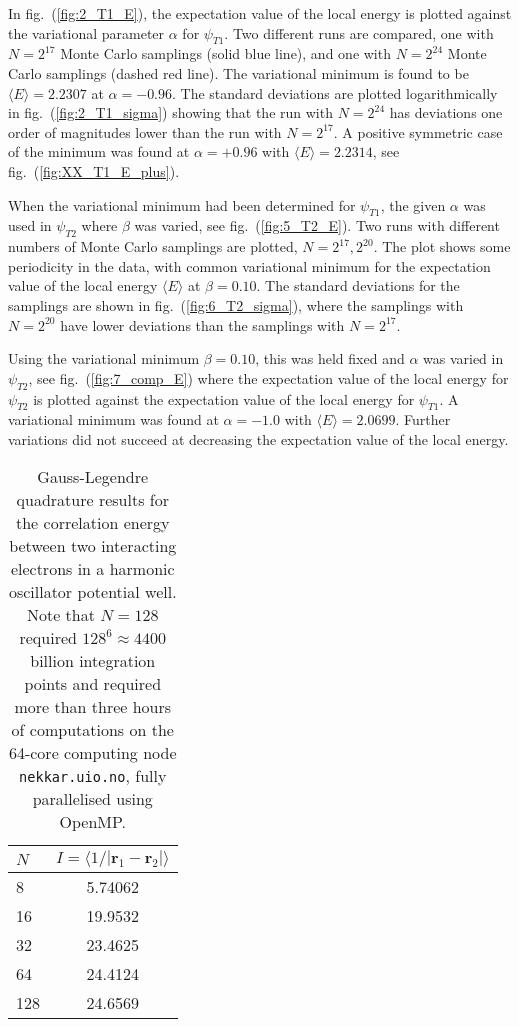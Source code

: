 \documentclass[a4paper,11pt]{article}
\begin{document}
In fig.~(\ref{fig:2_T1_E}), the expectation value of the local energy is plotted against the variational parameter $\alpha$ for $\psi_{T1}$. Two different runs are compared, one with $N=2^{17}$ Monte Carlo samplings (solid blue line), and one with $N=2^{24}$ Monte Carlo samplings (dashed red line). The variational minimum is found to be $\langle E \rangle = 2.2307$ at $\alpha = -0.96$. The standard deviations are plotted logarithmically in fig.~(\ref{fig:2_T1_sigma}) showing that the run with $N=2^{24}$ has deviations one order of magnitudes lower than the run with $N=2^{17}$. A positive symmetric case of the minimum was found at $\alpha = +0.96$ with $\langle E \rangle = 2.2314$, see fig.~(\ref{fig:XX_T1_E_plus}). 

When the variational minimum had been determined for $\psi_{T1}$, the given $\alpha$ was used in $\psi_{T2}$ where $\beta$ was varied, see fig.~(\ref{fig:5_T2_E}). Two runs with different numbers of Monte Carlo samplings are plotted, $N=2^{17}, 2^{20}$. The plot shows some periodicity in the data, with common variational minimum for the expectation value of the local energy $\langle E \rangle$ at $\beta = 0.10$. The standard deviations for the samplings are shown in fig.~(\ref{fig:6_T2_sigma}), where the samplings with $N=2^{20}$ have lower deviations than the samplings with $N=2^{17}$.

Using the variational minimum $\beta = 0.10$, this was held fixed and $\alpha$ was varied in $\psi_{T2}$, see fig.~(\ref{fig:7_comp_E}) where the expectation value of the local energy for $\psi_{T2}$ is plotted against the expectation value of the local energy for $\psi_{T1}$. A variational minimum was found at $\alpha = -1.0$ with $\langle E \rangle = 2.0699$. Further variations did not succeed at decreasing the expectation value of the local energy.

\begin{table}
    \centering
    \caption{Gauss-Legendre quadrature results for the correlation energy between two interacting electrons in a harmonic oscillator potential well. Note that $N=128$ required $128^6 \approx 4400$ billion integration points and required more than three hours of computations on the 64-core computing node \texttt{nekkar.uio.no}, fully parallelised using OpenMP.}
    \begin{tabular}{l c}
        \hline
        $N$ & $I = \langle 1/|\mathbf{r}_1 - \mathbf{r}_2| \rangle$ \\
        \hline
        8   &   5.74062 \\
        16  &   19.9532 \\
        32  &   23.4625 \\
        64  &   24.4124 \\
        128 &   24.6569 \\
        \hline
    \end{tabular}
    \label{tab:1_gauleg}
\end{table}
\end{document}
